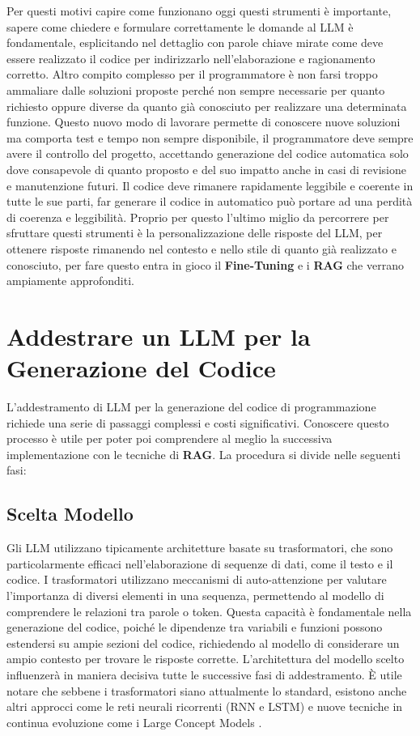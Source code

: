 \documentclass[12pt,a4paper,openright,twoside]{book}
\begin{document}
Per questi motivi capire come funzionano oggi questi strumenti è importante, sapere come chiedere e formulare correttamente le domande al LLM è fondamentale, esplicitando nel dettaglio con parole chiave mirate come deve essere realizzato il codice per indirizzarlo nell'elaborazione e ragionamento corretto.
Altro compito complesso per il programmatore è non farsi troppo ammaliare dalle soluzioni proposte perché non sempre necessarie per quanto richiesto oppure diverse da quanto già conosciuto
 per realizzare una determinata funzione.
Questo nuovo modo di lavorare permette di conoscere nuove soluzioni ma comporta test e tempo non sempre disponibile,
il programmatore deve sempre avere il controllo del progetto, accettando generazione del codice automatica solo dove consapevole di quanto proposto e del suo impatto anche in casi di revisione e manutenzione futuri.
Il codice deve rimanere rapidamente leggibile e coerente in tutte le sue parti, far generare il codice in automatico può portare ad una perdità di coerenza e leggibilità. 
Proprio per questo l'ultimo miglio da percorrere per sfruttare questi strumenti è la personalizzazione delle risposte del LLM, per ottenere risposte rimanendo nel contesto e nello stile di quanto già realizzato e conosciuto, per fare questo entra in gioco il \textbf{Fine-Tuning} e i \textbf{RAG} che verrano ampiamente approfonditi.

\chapter{Addestrare un LLM per la Generazione del Codice}

L'addestramento di LLM per la generazione del codice di programmazione richiede una serie di passaggi complessi e costi significativi.
Conoscere questo processo è utile per poter poi comprendere al meglio la successiva implementazione con le tecniche di \textbf{RAG}.
La procedura si divide nelle seguenti fasi:
\section{Scelta Modello}
Gli LLM utilizzano tipicamente architetture basate su trasformatori, che sono particolarmente efficaci nell'elaborazione di sequenze di dati, come il testo e il codice.
I trasformatori utilizzano meccanismi di auto-attenzione per valutare l'importanza di diversi elementi in una sequenza,
permettendo al modello di comprendere le relazioni tra parole o token.
Questa capacità è fondamentale nella generazione del codice, poiché le dipendenze tra variabili e funzioni possono estendersi su ampie sezioni del codice, richiedendo al modello di considerare un ampio contesto per trovare le risposte corrette.
L'architettura del modello scelto influenzerà in maniera decisiva tutte le successive fasi di addestramento.
È utile notare che sebbene i trasformatori siano attualmente lo standard, esistono anche altri approcci come le reti neurali ricorrenti (RNN e LSTM) e nuove tecniche in continua evoluzione come i Large Concept Models \cite{code-llm-survey-2024}.
\end{document}

